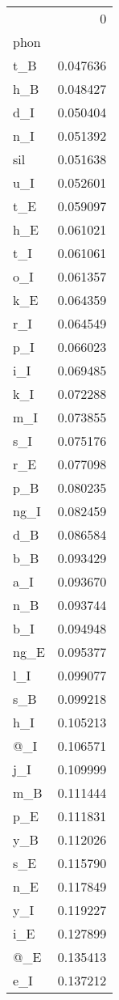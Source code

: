 \begin{tabular}{lr}
\toprule
{} &         0 \\
phon &           \\
\midrule
t\_B  &  0.047636 \\
h\_B  &  0.048427 \\
d\_I  &  0.050404 \\
n\_I  &  0.051392 \\
sil  &  0.051638 \\
u\_I  &  0.052601 \\
t\_E  &  0.059097 \\
h\_E  &  0.061021 \\
t\_I  &  0.061061 \\
o\_I  &  0.061357 \\
k\_E  &  0.064359 \\
r\_I  &  0.064549 \\
p\_I  &  0.066023 \\
i\_I  &  0.069485 \\
k\_I  &  0.072288 \\
m\_I  &  0.073855 \\
s\_I  &  0.075176 \\
r\_E  &  0.077098 \\
p\_B  &  0.080235 \\
ng\_I &  0.082459 \\
d\_B  &  0.086584 \\
b\_B  &  0.093429 \\
a\_I  &  0.093670 \\
n\_B  &  0.093744 \\
b\_I  &  0.094948 \\
ng\_E &  0.095377 \\
l\_I  &  0.099077 \\
s\_B  &  0.099218 \\
h\_I  &  0.105213 \\
@\_I  &  0.106571 \\
j\_I  &  0.109999 \\
m\_B  &  0.111444 \\
p\_E  &  0.111831 \\
y\_B  &  0.112026 \\
s\_E  &  0.115790 \\
n\_E  &  0.117849 \\
y\_I  &  0.119227 \\
i\_E  &  0.127899 \\
@\_E  &  0.135413 \\
e\_I  &  0.137212 \\

\end{tabular}
